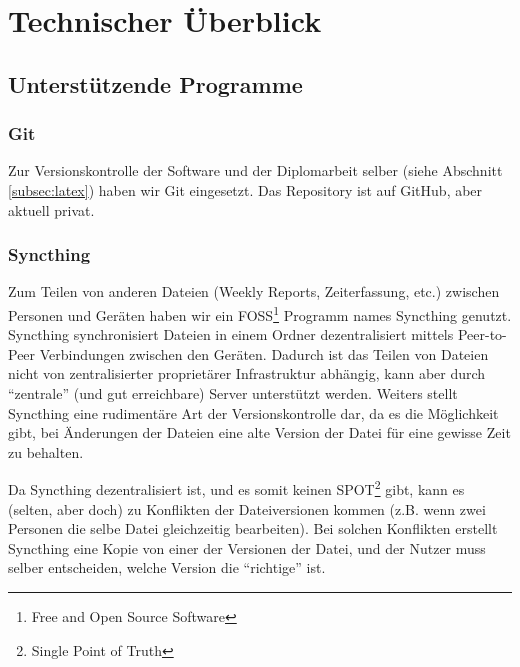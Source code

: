 
\section{Technischer Überblick}
\label{sec:ueberblick}


\subsection{Unterstützende Programme}
\label{subsec:ueberblick_programs}

\subsubsection{Git}
Zur Versionskontrolle der Software und der Diplomarbeit selber (siehe Abschnitt \ref{subsec:latex}) haben wir Git eingesetzt.
%
Das Repository ist auf GitHub, aber aktuell privat.

\subsubsection{Syncthing}
Zum Teilen von anderen Dateien (Weekly Reports, Zeiterfassung, etc.) zwischen Personen und Geräten
haben wir ein FOSS\footnote{Free and Open Source Software} Programm names Syncthing \cite{syncthing} genutzt.
%
Syncthing synchronisiert Dateien in einem Ordner dezentralisiert mittels Peer-to-Peer Verbindungen zwischen den Geräten.
%
Dadurch ist das Teilen von Dateien nicht von zentralisierter proprietärer Infrastruktur abhängig,
kann aber durch ``zentrale'' (und gut erreichbare) Server unterstützt werden.
%
Weiters stellt Syncthing eine rudimentäre Art der Versionskontrolle dar,
da es die Möglichkeit gibt,
bei Änderungen der Dateien eine alte Version der Datei für eine gewisse Zeit zu behalten.


Da Syncthing dezentralisiert ist,
und es somit keinen SPOT\footnote{Single Point of Truth} gibt,
kann es (selten, aber doch) zu Konflikten der Dateiversionen kommen (z.B. wenn zwei Personen die selbe Datei gleichzeitig bearbeiten). 
%
Bei solchen Konflikten erstellt Syncthing eine Kopie von einer der Versionen der Datei,
und der Nutzer muss selber entscheiden,
welche Version die ``richtige'' ist.

